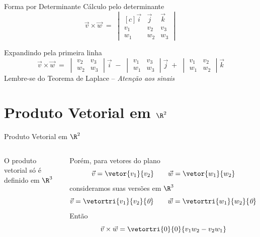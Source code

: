 \documentclass[fleqn,aspectratio=169,12pt]{beamer}
\begin{document}
\begin{frame}{Forma por Determinante}
  Cálculo pelo determinante
  \[
    \vec{v}\times\vec{w}
    \;=\;
    \begin{vmatrix}[c]
      \vec{i} & \vec{j} & \vec{k} \\
      v_1     & v_2     & v_3     \\
      w_1     & w_2     & w_3
    \end{vmatrix}
  \]

  \pause
  Expandindo pela primeira linha
  \[
    \vec{v} \times \vec{w}
    \;=\;
    \begin{vmatrix}
      v_2 & v_3 \\
      w_2 & w_3
    \end{vmatrix}
    \vec{i}
    \;-\;
    \begin{vmatrix}
      v_1 & v_3 \\
      w_1 & w_3
    \end{vmatrix}
    \vec{j}
    \;+\;
    \begin{vmatrix}
      v_1 & v_2 \\
      w_1 & w_2
    \end{vmatrix}
    \vec{k}
  \]
  \pause
  Lembre-se do Teorema de Laplace -- \emph{Atenção aos sinais}
\end{frame}



\section{Produto Vetorial em $\R^2$}

\begin{frame}{Produto Vetorial em $\R^2$}
\begin{columns}
  O produto vetorial só é definido em $\R^3$

  \pause
  \bigskip
  Porém, para vetores do plano
  \[
    \vec v = \vetor{v_1}{v_2}
    \qquad
    \vec w = \vetor{w_1}{w_2}
  \]
  \pause
  consideramos suas versões em $\R^3$
  \[
    \vec v = \vetortri{v_1}{v_2}{\emph{0}}
    \qquad
    \vec w = \vetortri{w_1}{w_2}{\emph{0}}
  \]
  \pause
  Então
  \[
    \vec{v}\times\vec{w} = \vetortri{0}{0}{v_1w_2-v_2w_1}
  \]
\end{columns}
\end{frame}
\end{document}
